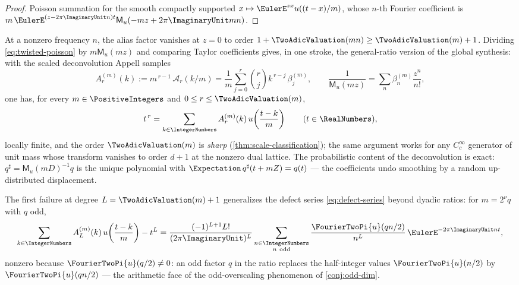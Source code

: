\documentclass[11pt,oneside]{article}
\numberwithin{equation}{section}
\theoremstyle{definition}
\theoremstyle{remark}
\newcommand{\MM}{\mathsf M}
\newcommand{\Gd}{\mathcal A}
\begin{document}
\begin{proof}
Poisson summation for the smooth compactly supported
$x\mapsto\EulerE^{zx}u((t-x)/m)$, whose $n$-th Fourier coefficient is
$m\,\EulerE^{(z-2\pi\ImaginaryUnit n)t}\MM_u(-mz+2\pi\ImaginaryUnit mn)$.
\end{proof}

At a nonzero frequency $n$, the alias factor vanishes at $z=0$ to
order $1+\TwoAdicValuation(mn)\ge\TwoAdicValuation(m)+1$.  Dividing
\eqref{eq:twisted-poisson} by $m\MM_u(mz)$ and comparing Taylor
coefficients gives, in one stroke, the general-ratio version of the
global synthesis: with the scaled deconvolution Appell samples
\begin{equation}
 A^{(m)}_r(k):=m^{\,r-1}\,\Gd_r(k/m)
 =\frac1m\sum_{j=0}^{r}\binom rj k^{\,r-j}\,\beta^{(m)}_j,
 \qquad
 \frac1{\MM_u(mz)}=\sum_n\beta^{(m)}_n\frac{z^{n}}{n!},
 \label{eq:scaled-appell}
\end{equation}
one has, for every $m\in\PositiveIntegers$ and $0\le r\le\TwoAdicValuation(m)$,
\begin{equation}
 t^{\,r}=\sum_{k\in\IntegerNumbers}A^{(m)}_r(k)\,
 u\!\left(\frac{t-k}{m}\right)
 \qquad(t\in\RealNumbers),
 \label{eq:general-reproduction}
\end{equation}
locally finite, and the order $\TwoAdicValuation(m)$ is \emph{sharp}
(\cref{thm:scale-classification}); the same argument works for any
$C_c^\infty$ generator of unit mass whose transform vanishes to
order $d+1$ at the nonzero dual lattice.  The probabilistic content
of the deconvolution is exact:
$q^{\sharp}=\MM_u(mD)^{-1}q$ is the unique polynomial with
$\Expectation\,q^{\sharp}(t+mZ)=q(t)$ --- the coefficients undo smoothing by a
random up-distributed displacement.

The first failure at degree $L=\TwoAdicValuation(m)+1$ generalizes the defect
series \eqref{eq:defect-series} beyond dyadic ratios: for
$m=2^{\nu}q$ with $q$ odd,
\begin{equation}
 \sum_{k\in\IntegerNumbers}A^{(m)}_L(k)\,u\!\left(\frac{t-k}{m}\right)-t^{L}
 =\frac{(-1)^{L+1}L!}{(2\pi\ImaginaryUnit)^{L}}
 \sum_{\substack{n\in\IntegerNumbers\\ n\ \mathrm{odd}}}
 \frac{\FourierTwoPi{u}(qn/2)}{n^{L}}\,\EulerE^{-2\pi\ImaginaryUnit nt},
 \label{eq:general-defect}
\end{equation}
nonzero because $\FourierTwoPi{u}(q/2)\ne0$: an odd factor $q$ in the ratio
replaces the half-integer values $\FourierTwoPi{u}(n/2)$ by
$\FourierTwoPi{u}(qn/2)$ --- the arithmetic face of the odd-overscaling
phenomenon of \cref{conj:odd-dim}.
\end{document}

